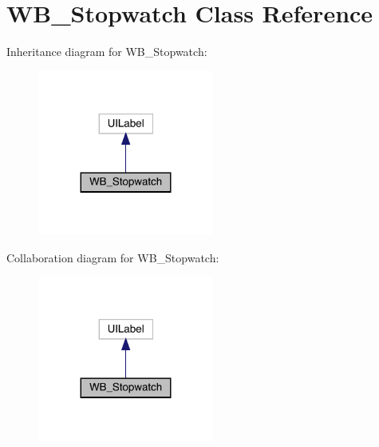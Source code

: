 \hypertarget{interface_w_b___stopwatch}{}\section{W\+B\+\_\+\+Stopwatch Class Reference}
\label{interface_w_b___stopwatch}


Inheritance diagram for W\+B\+\_\+\+Stopwatch\+:\nopagebreak
\begin{figure}[H]
\begin{center}
\leavevmode
\includegraphics[width=164pt]{interface_w_b___stopwatch__inherit__graph}
\end{center}
\end{figure}


Collaboration diagram for W\+B\+\_\+\+Stopwatch\+:\nopagebreak
\begin{figure}[H]
\begin{center}
\leavevmode
\includegraphics[width=164pt]{interface_w_b___stopwatch__coll__graph}
\end{center}
\end{figure}
